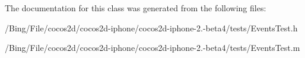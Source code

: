 The documentation for this class was generated from the following files\-:\begin{DoxyCompactItemize}
\item 
/\-Bing/\-File/cocos2d/cocos2d-\/iphone/cocos2d-\/iphone-\/2.-\/beta4/tests/Events\-Test.\-h\item 
/\-Bing/\-File/cocos2d/cocos2d-\/iphone/cocos2d-\/iphone-\/2.-\/beta4/tests/Events\-Test.\-m\end{DoxyCompactItemize}

